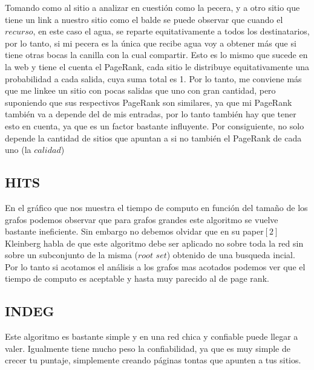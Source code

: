 \FloatBarrier

Tomando como al sitio a analizar en cuestión como la pecera, y a otro sitio que tiene un link a nuestro sitio como el balde se puede observar que cuando el $\textit{recurso}$, en este caso el agua, se reparte equitativamente a todos los destinatarios, por lo tanto, si mi pecera es la única que recibe agua voy a obtener más que si tiene otras bocas la canilla con la cual compartir. Esto es lo mismo que sucede en la web y tiene el cuenta el PageRank, cada sitio le distribuye equitativamente una probabilidad a cada salida, cuya suma total es 1. Por lo tanto, me conviene más que me linkee un sitio con pocas salidas que uno con gran cantidad, pero suponiendo que sus respectivos PageRank son similares, ya que mi PageRank también va a depende del de mis entradas, por lo tanto también hay que tener esto en cuenta, ya que es un factor bastante influyente. Por consiguiente, no solo depende la cantidad de sitios que apuntan a si no también el PageRank de cada uno (la  $\textit{calidad}$)

\newpage


\subsection{HITS}

En el gráfico que nos muestra el tiempo de computo en función del tamaño de los grafos podemos observar que para grafos grandes este algoritmo se vuelve bastante ineficiente. Sin embargo no debemos olvidar que en su paper$[2]$ Kleinberg habla de que este algoritmo debe ser aplicado no sobre toda la red sin sobre un subconjunto de la misma ($\textit{root set}$) obtenido de una busqueda incial. Por lo tanto si acotamos el análisis a los grafos mas acotados podemos ver que el tiempo de computo es aceptable y hasta muy parecido al de page rank. 

\subsection{INDEG}

Este algoritmo es bastante simple y en una red chica y confiable puede llegar a valer. Igualmente tiene mucho peso la confiabilidad, ya que es muy simple de crecer tu puntaje, simplemente creando páginas tontas que apunten a tus sitios. 